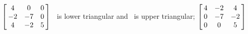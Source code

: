 {$\left[\hskip -3pt \begin{array}{ccc} 4&0&0\\  -2&-7&0
\\  4&-2&5\end{array}\hskip -3pt \right] $} 
{\tta\ is lower triangular and \ttat\ is upper triangular; $\left[\hskip -3pt \begin{array}{ccc} 4&-2&4\\  0&-7&-2
\\  0&0&5\end{array}\hskip -3pt \right] $}

 

